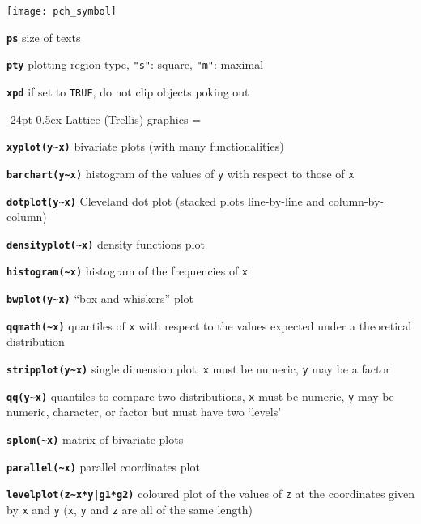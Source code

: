 \documentclass[8pt,landscape]{article}
\makeatletter
\renewcommand\section{\@startsection{section}{1}{0mm}%
                                     {-24pt}%
                                     {0.5ex}%
                                {\color{blue}\normalfont\large\bfseries}}
\newcommand{\code}{\texttt}
\newcommand{\bcode}[1]{\texttt{\textbf{#1}}}
\makeatother
\begin{document}
\begin{multicols*}{3}
\samepage\texttt{[image: pch\_symbol]} 

\bcode{ps}   size of texts

\bcode{pty}  plotting region type, \code{"s"}: square, \code{"m"}: maximal

\bcode{xpd}  if set to \code{TRUE}, do not clip objects poking out 





\section{Lattice (Trellis) graphics}
\everypar={\hangindent=9mm}

\bcode{xyplot(y\~{}x)}  bivariate plots (with many functionalities)

\bcode{barchart(y\~{}x)}  histogram of the values of \code{y} with
respect to those of \code{x}

\bcode{dotplot(y\~{}x)}  Cleveland dot plot (stacked plots line-by-line
and column-by-column)

\bcode{densityplot(\~{}x)}  density functions plot

\bcode{histogram(\~{}x)}  histogram of the frequencies of \code{x}

\bcode{bwplot(y\~{}x)}  ``box-and-whiskers'' plot

\bcode{qqmath(\~{}x)}  quantiles of \code{x} with respect to the values expected under a theoretical distribution

\bcode{stripplot(y\~{}x)}  single dimension plot, \code{x} must be numeric, \code{y} may be a factor

\bcode{qq(y\~{}x)}  quantiles to compare two distributions, \code{x} must be numeric, \code{y} may be numeric, character, or factor but must have two `levels'

\bcode{splom(\~{}x)}  matrix of bivariate plots

\bcode{parallel(\~{}x)}  parallel coordinates plot

\bcode{levelplot(z\~{}x*y|g1*g2)}  coloured plot of the values of \code{z} at the coordinates given by \code{x} and \code{y} (\code{x}, \code{y} and \code{z} are all of the same length)


\end{multicols*}
\end{document}
